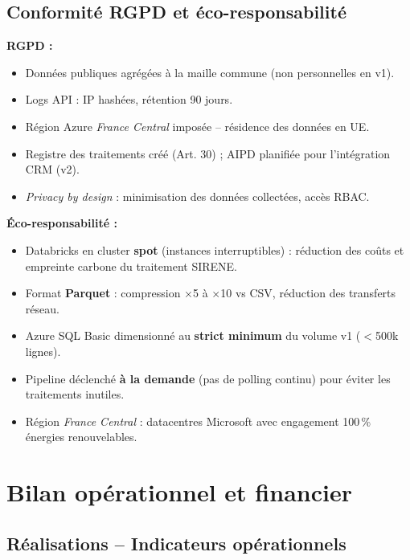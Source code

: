 \documentclass[11pt,a4paper]{article}
\begin{document}
\subsection{Conformité RGPD et éco-responsabilité}

\textbf{RGPD :}
\begin{itemize}
  \item Données publiques agrégées à la maille commune (non personnelles en v1).
  \item Logs API : IP hashées, rétention 90 jours.
  \item Région Azure \textit{France Central} imposée -- résidence des données en UE.
  \item Registre des traitements créé (Art. 30) ; AIPD planifiée pour l'intégration CRM (v2).
  \item \textit{Privacy by design} : minimisation des données collectées, accès RBAC.
\end{itemize}

\textbf{Éco-responsabilité :}
\begin{itemize}
  \item Databricks en cluster \textbf{spot} (instances interruptibles) : réduction des coûts et empreinte carbone du traitement SIRENE.
  \item Format \textbf{Parquet} : compression $\times$5 à $\times$10 vs CSV, réduction des transferts réseau.
  \item Azure SQL Basic dimensionné au \textbf{strict minimum} du volume v1 ($<$500k lignes).
  \item Pipeline déclenché \textbf{à la demande} (pas de polling continu) pour éviter les traitements inutiles.
  \item Région \textit{France Central} : datacentres Microsoft avec engagement 100\,\% énergies renouvelables.
\end{itemize}

\section{Bilan opérationnel et financier}

\subsection{Réalisations -- Indicateurs opérationnels}
\end{document}
